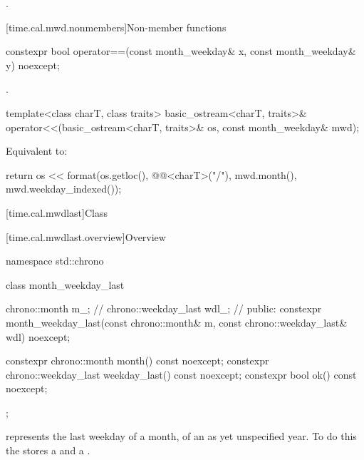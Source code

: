 \begin{itemdescr}
\pnum
\returns
{}.
\end{itemdescr}

[time.cal.mwd.nonmembers]{Non-member functions}

%
\begin{itemdecl}
constexpr bool operator==(const month_weekday& x, const month_weekday& y) noexcept;
\end{itemdecl}

\begin{itemdescr}
\pnum
\returns
{}.
\end{itemdescr}

%
\begin{itemdecl}
template<class charT, class traits>
  basic_ostream<charT, traits>&
    operator<<(basic_ostream<charT, traits>& os, const month_weekday& mwd);
\end{itemdecl}

\begin{itemdescr}
\pnum
\effects
Equivalent to:
\begin{codeblock}
return os << format(os.getloc(), @@<charT>("{}/{}"),
                    mwd.month(), mwd.weekday_indexed());
\end{codeblock}
\end{itemdescr}

[time.cal.mwdlast]{Class }

[time.cal.mwdlast.overview]{Overview}

\begin{codeblock}
namespace std::chrono {
  class month_weekday_last {
    chrono::month        m_;    // \expos
    chrono::weekday_last wdl_;  // \expos
  public:
    constexpr month_weekday_last(const chrono::month& m,
                                 const chrono::weekday_last& wdl) noexcept;

    constexpr chrono::month        month()        const noexcept;
    constexpr chrono::weekday_last weekday_last() const noexcept;
    constexpr bool ok() const noexcept;
  };
}
\end{codeblock}

\pnum
{} represents the last weekday of a month,
of an as yet unspecified year.
To do this the  stores a  and a .

